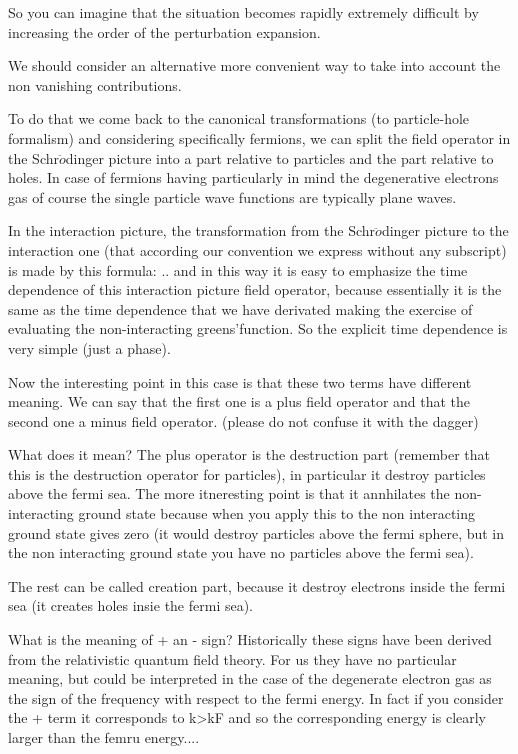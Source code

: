 \documentclass[../main/main.tex]{subfiles}
\begin{document}
So you can imagine that the situation becomes rapidly extremely difficult by increasing the order of the perturbation expansion.


We should consider an alternative more convenient way to take into account the non vanishing contributions.


To do that we come back to the canonical transformations (to particle-hole formalism) and considering specifically fermions, we can split the field operator in the Schr$\ddot{o}$dinger picture into a part relative to particles and the part relative to holes. In case of fermions having particularly in mind the degenerative electrons gas of course the single particle wave functions are typically plane waves.

In the interaction picture, the transformation from the Schr$\ddot{o}$dinger picture to the interaction one (that according our convention we express without any subscript) is made by this formula:
..
and in this way it is easy to emphasize the time dependence of this interaction picture field operator, because essentially it is the same as the time dependence that we have derivated making the exercise of evaluating the non-interacting greens'function.  So the explicit time dependence is very simple (just a phase).


Now the interesting point in this case is that these two terms have different meaning. We can say that the first one is a plus field operator and that the second one a minus field operator. (please do not confuse it with the dagger)

What does it mean? The plus operator is the destruction part (remember that this is the destruction operator for particles), in particular it destroy particles above the fermi sea. The more itneresting point is that it annhilates the non-interacting ground state because when you apply this to the non interacting ground state gives zero (it would destroy particles above the fermi sphere, but in the non interacting ground state you have no particles above the fermi sea).


The rest can be called creation part, because it destroy electrons inside the fermi sea (it creates holes insie the fermi sea).

What is the meaning of + an - sign? Historically these signs have been derived from the relativistic quantum field theory. For us they have no particular meaning, but could be interpreted in the case of the degenerate electron gas as the sign of the frequency with respect to the fermi energy. In fact if you consider the + term it corresponds to k>kF and so the corresponding energy is clearly larger than the femru energy....
\end{document}
